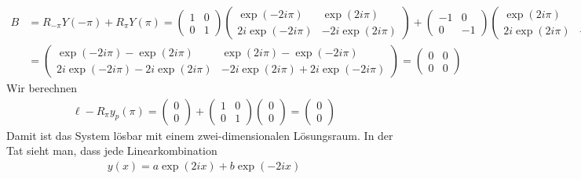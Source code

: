 \begin{solution}
\begin{enumerate}[label = \textbf{\alph*)}]
  \begin{align*}
    B &= R_{-\pi}Y(-\pi) + R_{\pi}Y(\pi) =
    \begin{pmatrix}
      1 & 0 \\ 0 & 1
    \end{pmatrix}
    \begin{pmatrix}
      \exp(-2i\pi) & \exp(2i\pi) \\ 2i\exp(-2i\pi) & -2i\exp(2i\pi)
    \end{pmatrix} +
    \begin{pmatrix}
      -1 & 0 \\ 0 & -1
    \end{pmatrix}
    \begin{pmatrix}
      \exp(2i\pi) & \exp(-2i\pi) \\ 2i\exp(2i\pi) & -2i\exp(-2i\pi)
    \end{pmatrix} \\
    &= \begin{pmatrix}
      \exp(-2i\pi) - \exp(2i\pi) & \exp(2i\pi) - \exp(-2i\pi) \\
      2i\exp(-2i\pi) - 2i\exp(2i\pi) & -2i\exp(2i\pi) + 2i\exp(-2i\pi)
    \end{pmatrix}
    = \begin{pmatrix}
      0 & 0 \\
      0 & 0
    \end{pmatrix}
  \end{align*}
  Wir berechnen
  \begin{align*}
    \ell - R_{\pi}y_p(\pi) = \begin{pmatrix}
      0 \\ 0
    \end{pmatrix} +
    \begin{pmatrix}
      1 & 0 \\ 0 & 1
    \end{pmatrix}
    \begin{pmatrix}
      0 \\ 0
    \end{pmatrix}
    = \begin{pmatrix}
      0 \\ 0
    \end{pmatrix}
  \end{align*}
  Damit ist das System lösbar mit einem zwei-dimensionalen Lösungsraum.
  In der Tat sieht man, dass jede Linearkombination
  \begin{align*}
    y(x) = a\exp(2ix) + b\exp(-2ix)
  \end{align*}

\end{enumerate}
\end{solution}

